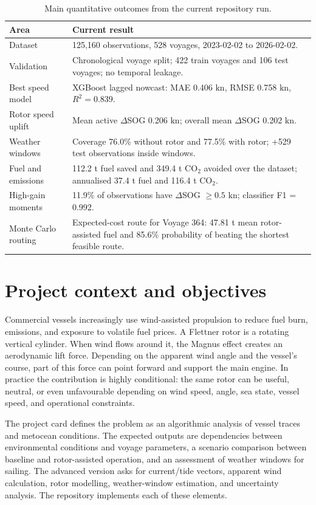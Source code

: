 \documentclass[10pt,a4paper]{article}
\newcommand{\kn}{\ensuremath{\mathrm{kn}}}
\newcommand{\co}{CO$_2$}
\newcommand{\sog}{SOG}
\begin{document}
\begin{table}[H]
\centering
\caption{Main quantitative outcomes from the current repository run.}
\begin{tabularx}{\textwidth}{>{\raggedright\arraybackslash}p{}X}
\toprule
\textbf{Area} & \textbf{Current result} \\
\midrule
Dataset & 125,160 observations, 528 voyages, 2023-02-02 to 2026-02-02. \\
Validation & Chronological voyage split; 422 train voyages and 106 test voyages; no temporal leakage. \\
Best speed model & XGBoost lagged nowcast: MAE 0.406 \kn{}, RMSE 0.758 \kn{}, $R^2=0.839$. \\
Rotor speed uplift & Mean active $\Delta$\sog{} 0.206 \kn{}; overall mean $\Delta$\sog{} 0.202 \kn{}. \\
Weather windows & Coverage 76.0\% without rotor and 77.5\% with rotor; +529 test observations inside windows. \\
Fuel and emissions & 112.2 t fuel saved and 349.4 t \co{} avoided over the dataset; annualised 37.4 t fuel and 116.4 t \co{}. \\
High-gain moments & 11.9\% of observations have $\Delta$\sog{} $\geq 0.5$ \kn{}; classifier F1 = 0.992. \\
Monte Carlo routing & Expected-cost route for Voyage 364: 47.81 t mean rotor-assisted fuel and 85.6\% probability of beating the shortest feasible route. \\
\bottomrule
\end{tabularx}
\end{table}

\section{Project context and objectives}

Commercial vessels increasingly use wind-assisted propulsion to reduce fuel
burn, emissions, and exposure to volatile fuel prices. A Flettner rotor is a
rotating vertical cylinder. When wind flows around it, the Magnus effect creates
an aerodynamic lift force. Depending on the apparent wind angle and the vessel's
course, part of this force can point forward and support the main engine. In
practice the contribution is highly conditional: the same rotor can be useful,
neutral, or even unfavourable depending on wind speed, angle, sea state, vessel
speed, and operational constraints.

The project card defines the problem as an algorithmic analysis of vessel traces
and metocean conditions. The expected outputs are dependencies between
environmental conditions and voyage parameters, a scenario comparison between
baseline and rotor-assisted operation, and an assessment of weather windows for
sailing. The advanced version asks for current/tide vectors, apparent wind
calculation, rotor modelling, weather-window estimation, and uncertainty
analysis. The repository implements each of these elements.
\end{document}
